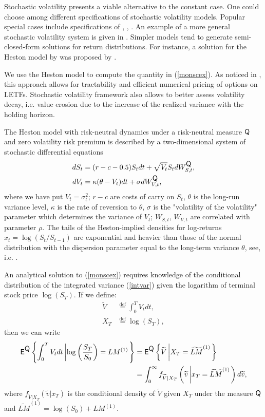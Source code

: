 \documentclass{rQUF2e}
\newcommand{\E}{\mathop{\mbox{\sf E}}}
\newcommand{\QQ}{\mathop{\mbox{\sf Q}}}
\theoremstyle{plain}
\theoremstyle{definition}
\begin{document}
	Stochastic volatility presents a viable alternative to the constant case. One could choose among different specifications of stochastic volatility models. Popular special cases include specifications of \citet{heston}, \citet{hull_white}, \citet{schoebel_zhu}. An example of a more general stochastic volatility system is given in \citet{leung_sircar}. Simpler models tend to generate semi-closed-form solutions for return distributions. For instance, a solution for the Heston model by \citet{heston} was proposed by \citet{dragulescu_yakovenko}.
	
	We use the Heston model to compute the quantity in (\ref{monscex}). As noticed in \citet{leung_santoli}, this approach allows for tractability and efficient numerical pricing of options on LETFs. Stochastic volatility framework also allows to better assess volatility decay, i.e. value erosion due to the increase of the realized variance with the holding horizon.
	
	The Heston model with risk-neutral dynamics under a risk-neutral measure $\QQ$ and zero volatility risk premium is described by a two-dimensional system of stochastic differential equations
	\begin{align}
	dS_t &= (r-c-0.5)S_t dt + \sqrt{V_t} S_t dW_{S,t}^{\QQ},\label{sz1}\\
	dV_t &= \kappa(\theta - V_t)dt + \sigma dW_{V,t}^{\QQ},\label{sz2}
	\end{align}
	where we have put $V_t = \sigma_t^2$; $r-c$ are costs of carry on $S_t$, $\theta$ is the long-run variance level, $\kappa$ is the rate of reversion to $\theta$, $\sigma$ is the "volatility of the volatility" parameter which determines the variance of $V_t$; $W_{S,t}$, $W_{V,t}$ are correlated with parameter $\rho$. The tails of the Heston-implied densities for log-returns $x_t = \log(S_t/S_{t-1})$ are exponential and heavier than those of the normal distribution with the dispersion parameter equal to the long-term variance $\theta$, see, i.e. \citet{cizek_et_al}.
	
	An analytical solution to (\ref{monscex}) requires knowledge of the conditional distribution of the integrated variance (\ref{intvar}) given the logarithm of terminal stock price $\log (S_T)$. If we define:
	\begin{align*}
	\widetilde{V} &\stackrel{\operatorname{def}}{=} \int_{0}^{T}V_t dt,\\
	X_T &\stackrel{\operatorname{def}}{=} \log(S_T),
	\end{align*}
	then we can write
	\begin{align}
	{\E}^{\QQ}\left\{ \int_{0}^{T}V_t dt \left| \log \left(\frac{S_T}{S_0}\right) = LM^{(1)} \right.\right\} &= {\E}^{\QQ}\left\{ \widetilde{V} \left| X_T = \widetilde{LM}^{(1)} \right.\right\} \nonumber \\
	&= \int_{0}^{\infty} f_{\widetilde{V}|X_T}\left(\widetilde{v}\left|x_T=\widetilde{LM}^{(1)}\right.\right) d\widetilde{v}, \label{expconddens}
	\end{align}
	where $f_{\widetilde{V}|X_T}(\widetilde{v}|x_T)$ is the conditional density of $\widetilde{V}$ given $X_T$ under the measure $\QQ$ and $\widetilde{LM}^{(1)} = \log(S_0) + LM^{(1)}$.
	
\end{document}

